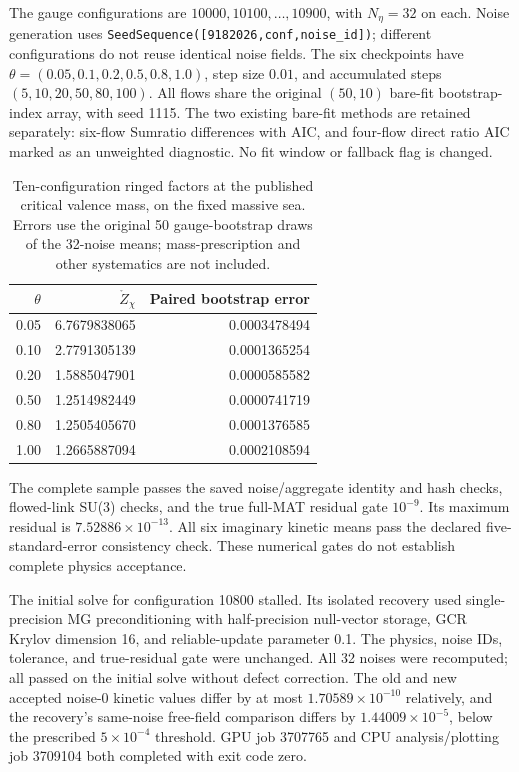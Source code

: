 \documentclass[11pt]{article}
\numberwithin{equation}{section}
\begin{document}
The gauge configurations are \(10000,10100,\ldots,10900\), with
\(N_\eta=32\) on each. Noise generation uses
\texttt{SeedSequence([9182026,conf,noise\_id])}; different configurations
do not reuse identical noise fields. The six checkpoints have
\(\theta=(0.05,0.1,0.2,0.5,0.8,1.0)\), step size \(0.01\), and
accumulated steps \((5,10,20,50,80,100)\). All flows share the original
\((50,10)\) bare-fit bootstrap-index array, with seed 1115. The two
existing bare-fit methods are retained separately: six-flow Sumratio
differences with AIC, and four-flow direct ratio AIC marked as an
unweighted diagnostic. No fit window or fallback flag is changed.

\begin{table}[htbp]
 \centering
 \begin{tabular}{rrr}
 \toprule
 \(\theta\) & \(\mathring Z_\chi\) & Paired bootstrap error \\
 \midrule
 0.05 & 6.7679838065 & 0.0003478494 \\
 0.10 & 2.7791305139 & 0.0001365254 \\
 0.20 & 1.5885047901 & 0.0000585582 \\
 0.50 & 1.2514982449 & 0.0000741719 \\
 0.80 & 1.2505405670 & 0.0001376585 \\
 1.00 & 1.2665887094 & 0.0002108594 \\
 \bottomrule
 \end{tabular}
 \caption{Ten-configuration ringed factors at the published critical valence
 mass, on the fixed massive sea. Errors use the original 50 gauge-bootstrap
 draws of the 32-noise means; mass-prescription and other systematics are
 not included.}
 \label{tab:ringed-tenconf}
\end{table}

The complete sample passes the saved noise/aggregate identity and hash
checks, flowed-link SU(3) checks, and the true full-MAT residual gate
\(10^{-9}\). Its maximum residual is \(7.52886\times10^{-13}\).
All six imaginary kinetic means pass the declared five-standard-error
consistency check. These numerical gates do not establish complete physics
acceptance.

The initial solve for configuration 10800 stalled. Its isolated recovery
used single-precision MG preconditioning with half-precision null-vector
storage, GCR Krylov dimension 16, and reliable-update parameter 0.1.
The physics, noise IDs, tolerance, and true-residual gate were unchanged.
All 32 noises were recomputed; all passed on the initial solve without
defect correction. The old and new accepted noise-0 kinetic values differ
by at most \(1.70589\times10^{-10}\) relatively, and the recovery's
same-noise free-field comparison differs by \(1.44009\times10^{-5}\),
below the prescribed \(5\times10^{-4}\) threshold. GPU job 3707765 and
CPU analysis/plotting job 3709104 both completed with exit code zero.
\end{document}
